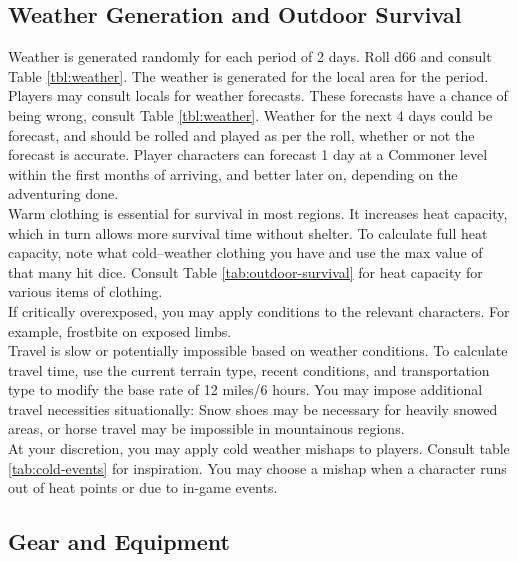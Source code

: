 \documentclass[notitlepage]{article}
\begin{document}
\begin{multicols}{2}
\subsection*{Weather Generation and Outdoor Survival}
\label{sec:weather-outdoor}

Weather is generated randomly for each period of 2 days. Roll d66 and consult Table \ref{tbl:weather}. The weather is generated for the local area for the period. \\

Players may consult locals for weather forecasts.
These forecasts have a chance of being wrong, consult Table \ref{tbl:weather}.
Weather for the next 4 days could be forecast, and should be rolled and played as per the roll, whether or not the forecast is accurate.
Player characters can forecast 1 day at a Commoner level within the first months of arriving, and better later on, depending on the adventuring done. \\

Warm clothing is essential for survival in most regions.
It increases heat capacity, which in turn allows more survival time without shelter.
To calculate full heat capacity, note what cold--weather clothing you have and use the max value of that many hit dice.
Consult Table \ref{tab:outdoor-survival} for heat capacity for various items of clothing. \\

If critically overexposed, you may apply conditions to the relevant characters.
For example, frostbite on exposed limbs. \\

Travel is slow or potentially impossible based on weather conditions.
To calculate travel time, use the current terrain type, recent conditions, and transportation type to modify the base rate of 12 miles/6 hours.
You may impose additional travel necessities situationally: Snow shoes may be necessary for heavily snowed areas, or horse travel may be impossible in mountainous regions. \\

At your discretion, you may apply cold weather mishaps to players.
Consult table \ref{tab:cold-events} for inspiration.
You may choose a mishap when a character runs out of heat points or due to in-game events.


\subsection*{Gear and Equipment}


\end{multicols}
\end{document}
